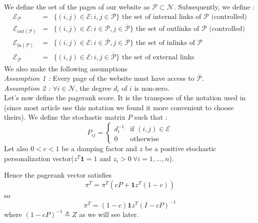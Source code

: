 \documentclass{article}
\newcommand{\1}{\mathbf{1}}
\theoremstyle{definition}
\begin{document}
We define the set of the pages of our website as  \(\mathcal{P} \subset \mathcal{N}\). Subsequently, we define :
\begin{eqnarray*}
\mathcal{E}_{\mathcal{P}} & = & \{(i,j)\in \mathcal{E} : i,j \in \mathcal{P}\} \text{ the set of internal links of }\mathcal{P} \text{ (controlled)} \\
  \mathcal{E}_{\text{out}(\mathcal{P})} & = & \{(i,j)\in \mathcal{E} : i \in \mathcal{P},j \in \overline{\mathcal{P}}\} \text{ the set of outlinks of }\mathcal{P} \text{ (controlled)}\\
  \mathcal{E}_{\text{in}(\mathcal{P})} & = & \{(i,j)\in \mathcal{E} : i \in \overline{\mathcal{P}},j \in \mathcal{P}\} \text{ the set of inlinks of }\mathcal{P} \\
\mathcal{E}_{\overline{\mathcal{P}}} & = & \{(i,j)\in \mathcal{E} : i,j \in \overline{\mathcal{P}}\} \text{ the set of external links}
\end{eqnarray*}
We also make the following assumptions\\
\textit{Assumption 1 :} Every page of the website must have access to \(\overline{\mathcal{P}}\).\\
\textit{Assumption 2 :} \(\forall i\in \mathcal{N}\), the degree \(d_i\) of \(i\) is non-zero.\\
Let's now define the pagerank score. It is the transpose of the notation used in \cite{leskovec}(since most article use this notation we found it more convenient to choose theirs).
We define the stochastic matrix \(P\) such that :
\[ P_{ij} = \left\lbrace \begin{array}{ll}
d_i^{-1} & \text{if }(i,j)\in \mathcal{E} \\
0 & \text{otherwise}
\end{array}
\right.\]
Let also \(0<c<1\) be a damping factor and \(z\) be a positive stochastic personalization vector(\(z^T \mathbf{1} = 1\) and \(z_i>0 \:\forall i = 1,...,n\)).

Hence the pagerank vector satisfies
\[ \pi^T = \pi^T (cP + \1 z^T(1-c)) \]
so
\[ \pi^T = (1-c)\1 z^T(I - cP)^{-1} \]
where \((1 - cP)^{-1} \triangleq Z\) as we will see later.
\end{document}
